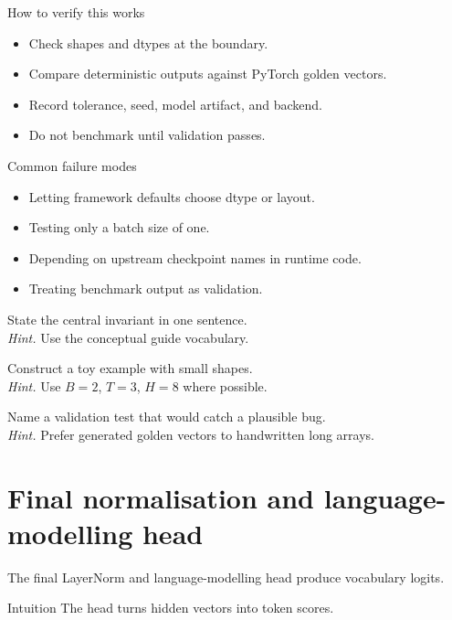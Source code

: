 \begin{verificationbox}{How to verify this works}
\begin{itemize}
\item Check shapes and dtypes at the boundary.
\item Compare deterministic outputs against PyTorch golden vectors.
\item Record tolerance, seed, model artifact, and backend.
\item Do not benchmark until validation passes.
\end{itemize}
\end{verificationbox}

\begin{warningbox}{Common failure modes}
\begin{itemize}
\item Letting framework defaults choose dtype or layout.
\item Testing only a batch size of one.
\item Depending on upstream checkpoint names in runtime code.
\item Treating benchmark output as validation.
\end{itemize}
\end{warningbox}

\begin{chapterexercises}
\item State the central invariant in one sentence.\\
\textit{Hint.} Use the conceptual guide vocabulary.
\item Construct a toy example with small shapes.\\
\textit{Hint.} Use $B=2$, $T=3$, $H=8$ where possible.
\item Name a validation test that would catch a plausible bug.\\
\textit{Hint.} Prefer generated golden vectors to handwritten long arrays.
\end{chapterexercises}

\chapter{Final normalisation and language-modelling head}
\label{ch:final-head}
The final LayerNorm and language-modelling head produce vocabulary logits.



\begin{intuitionbox}{Intuition}
The head turns hidden vectors into token scores.
\end{intuitionbox}

